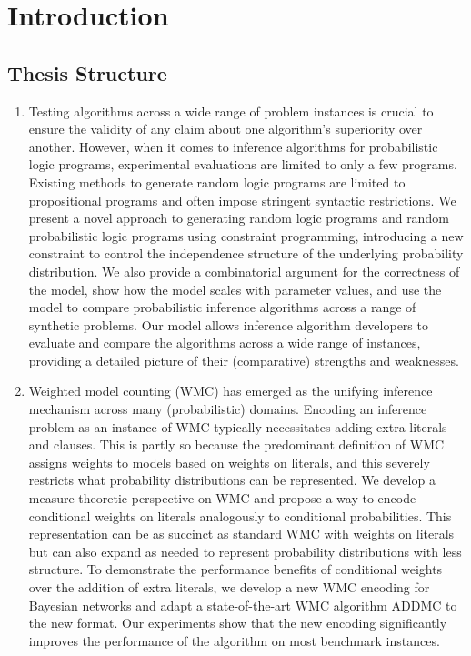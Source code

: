 \chapter{Introduction}

\section{Thesis Structure}

\begin{enumerate}
\item Testing algorithms across a wide range of problem instances is crucial to ensure the validity of any claim about one algorithm's superiority over another. However, when it comes to inference algorithms for probabilistic logic programs, experimental evaluations are limited to only a few programs. Existing methods to generate random logic programs are limited to propositional programs and often impose stringent syntactic restrictions. We present a novel approach to generating random logic programs and random probabilistic logic programs using constraint programming, introducing a new constraint to control the independence structure of the underlying probability distribution. We also provide a combinatorial argument for the correctness of the model, show how the model scales with parameter values, and use the model to compare probabilistic inference algorithms across a range of synthetic problems. Our model allows inference algorithm developers to evaluate and compare the algorithms across a wide range of instances, providing a detailed picture of their (comparative) strengths and weaknesses.
\item Weighted model counting (WMC) has emerged as the unifying inference mechanism across many (probabilistic) domains. Encoding an inference problem as an instance of WMC typically necessitates adding extra literals and clauses. This is partly so because the predominant definition of WMC assigns weights to models based on weights on literals, and this severely restricts what probability distributions can be represented. We develop a measure-theoretic perspective on WMC and propose a way to encode conditional weights on literals analogously to conditional probabilities. This representation can be as succinct as standard WMC with weights on literals but can also expand as needed to represent probability distributions with less structure. To demonstrate the performance benefits of conditional weights over the addition of extra literals, we develop a new WMC encoding for Bayesian networks and adapt a state-of-the-art WMC algorithm \textsf{ADDMC} to the new format. Our experiments show that the new encoding significantly improves the performance of the algorithm on most benchmark instances.

\end{enumerate}
